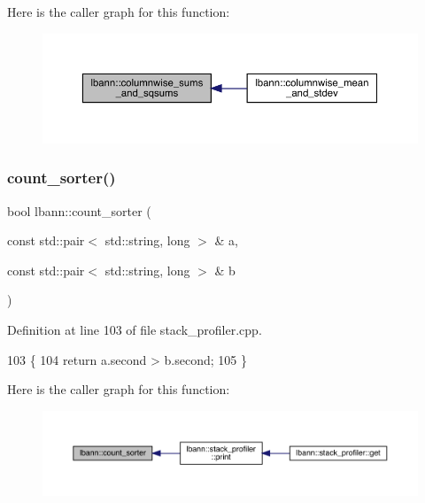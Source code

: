 Here is the caller graph for this function\+:\nopagebreak
\begin{figure}[H]
\begin{center}
\leavevmode
\includegraphics[width=350pt]{namespacelbann_ab043d2f2f9dea0ee861aff3a38216b24_icgraph}
\end{center}
\end{figure}
\mbox{\label{namespacelbann_aedcfce41af2eae595ce58b1180f66bd1}} 
\subsubsection{\texorpdfstring{count\+\_\+sorter()}{count\_sorter()}}
{\footnotesize\ttfamily bool lbann\+::count\+\_\+sorter (\begin{DoxyParamCaption}\item[{const std\+::pair$<$ std\+::string, long $>$ \&}]{a,  }\item[{const std\+::pair$<$ std\+::string, long $>$ \&}]{b }\end{DoxyParamCaption})}



Definition at line 103 of file stack\+\_\+profiler.\+cpp.


\begin{DoxyCode}
103                                                                                          \{
104   \textcolor{keywordflow}{return} a.second > b.second;
105 \}
\end{DoxyCode}
Here is the caller graph for this function\+:\nopagebreak
\begin{figure}[H]
\begin{center}
\leavevmode
\includegraphics[width=350pt]{namespacelbann_aedcfce41af2eae595ce58b1180f66bd1_icgraph}
\end{center}
\end{figure}
\mbox{\label{namespacelbann_a1208673c880ccf0e1a9c5db6a8ed81f8}} 
